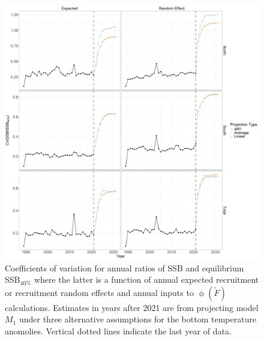 \documentclass[
]{article}
\begin{document}
\begin{figure}

{\centering \includegraphics[height=0.95\textheight]{proj_SSB_status_CV} 

}

\caption{Coefficients of variation for annual ratios of SSB and equilibrium SSB$_{40\%}$ where the latter is a function of annual expected recruitment or recruitment random effects and annual inputs to $\upphi(\widetilde{F})$ calculations. Estimates in years after 2021 are from projecting model $M_1$ under three alternative assumptions for the bottom temperature anomolies. Vertical dotted lines indicate the last year of data.}\label{fig:annual-SSB-status-cvs}
\end{figure}
\end{document}
